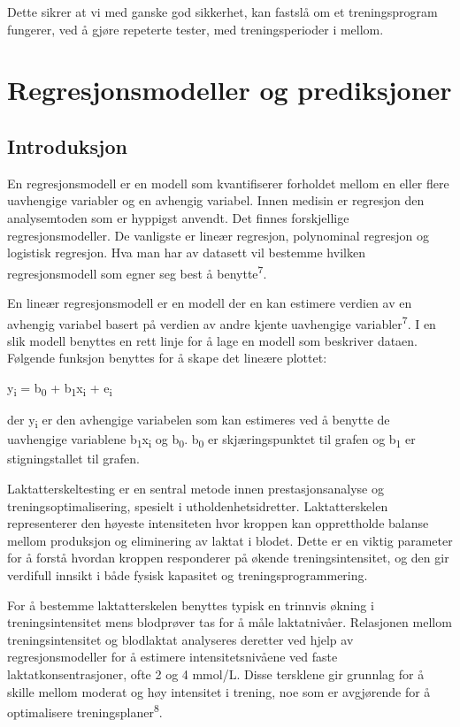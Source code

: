 \documentclass[
  letterpaper,
  DIV=11,
  numbers=noendperiod]{scrreprt}
\begin{document}
Dette sikrer at vi med ganske god sikkerhet, kan fastslå om et
treningsprogram fungerer, ved å gjøre repeterte tester, med
treningsperioder i mellom.


\chapter{Regresjonsmodeller og
prediksjoner}\label{regresjonsmodeller-og-prediksjoner}

\section{Introduksjon}\label{introduksjon-1}

En regresjonsmodell er en modell som kvantifiserer forholdet mellom en
eller flere uavhengige variabler og en avhengig variabel. Innen medisin
er regresjon den analysemtoden som er hyppigst anvendt. Det finnes
forskjellige regresjonsmodeller. De vanligste er lineær regresjon,
polynominal regresjon og logistisk regresjon. Hva man har av datasett
vil bestemme hvilken regresjonsmodell som egner seg best å
benytte\textsuperscript{7}.

En lineær regresjonsmodell er en modell der en kan estimere verdien av
en avhengig variabel basert på verdien av andre kjente uavhengige
variabler\textsuperscript{7}. I en slik modell benyttes en rett linje
for å lage en modell som beskriver dataen. Følgende funksjon benyttes
for å skape det lineære plottet:

y\textsubscript{i} = b\textsubscript{0} +
b\textsubscript{1}x\textsubscript{i} + e\textsubscript{i}

der y\textsubscript{i} er den avhengige variabelen som kan estimeres ved
å benytte de uavhengige variablene b\textsubscript{1}x\textsubscript{i}
og b\textsubscript{0}. b\textsubscript{0} er skjæringspunktet til grafen
og b\textsubscript{1} er stigningstallet til grafen.

Laktatterskeltesting er en sentral metode innen prestasjonsanalyse og
treningsoptimalisering, spesielt i utholdenhetsidretter. Laktatterskelen
representerer den høyeste intensiteten hvor kroppen kan opprettholde
balanse mellom produksjon og eliminering av laktat i blodet. Dette er en
viktig parameter for å forstå hvordan kroppen responderer på økende
treningsintensitet, og den gir verdifull innsikt i både fysisk kapasitet
og treningsprogrammering.

For å bestemme laktatterskelen benyttes typisk en trinnvis økning i
treningsintensitet mens blodprøver tas for å måle laktatnivåer.
Relasjonen mellom treningsintensitet og blodlaktat analyseres deretter
ved hjelp av regresjonsmodeller for å estimere intensitetsnivåene ved
faste laktatkonsentrasjoner, ofte 2 og 4 mmol/L. Disse tersklene gir
grunnlag for å skille mellom moderat og høy intensitet i trening, noe
som er avgjørende for å optimalisere treningsplaner\textsuperscript{8}.
\end{document}
